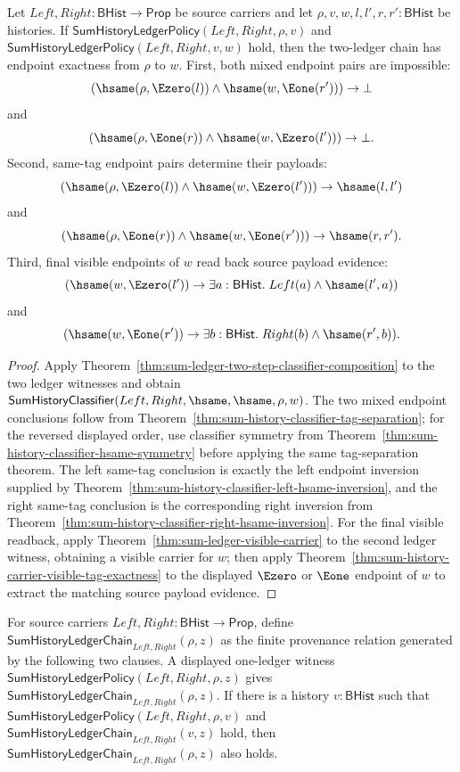 \begin{theorem}
\label{thm:sum-ledger-two-step-endpoint-exactness}
Let $Left,Right:\mathsf{BHist}\to\mathsf{Prop}$ be source carriers and let
$\rho,v,w,l,l',r,r':\mathsf{BHist}$ be histories. If
$\mathsf{SumHistoryLedgerPolicy}(Left,Right,\rho,v)$ and
$\mathsf{SumHistoryLedgerPolicy}(Left,Right,v,w)$ hold, then the two-ledger
chain has endpoint exactness from $\rho$ to $w$. First, both mixed endpoint
pairs are impossible:
$$
(\hsame(\rho,\Ezero(l))\land \hsame(w,\Eone(r')))\to\bot
$$
and
$$
(\hsame(\rho,\Eone(r))\land \hsame(w,\Ezero(l')))\to\bot.
$$
Second, same-tag endpoint pairs determine their payloads:
$$
(\hsame(\rho,\Ezero(l))\land\hsame(w,\Ezero(l')))\to\hsame(l,l')
$$
and
$$
(\hsame(\rho,\Eone(r))\land\hsame(w,\Eone(r')))\to\hsame(r,r').
$$
Third, final visible endpoints of $w$ read back source payload evidence:
$$
(\hsame(w,\Ezero(l'))\to\exists a:\mathsf{BHist}.\;Left(a)\land\hsame(l',a))
$$
and
$$
(\hsame(w,\Eone(r'))\to\exists b:\mathsf{BHist}.\;Right(b)\land\hsame(r',b)).
$$
\end{theorem}
\begin{proof}
Apply Theorem~\ref{thm:sum-ledger-two-step-classifier-composition} to the two
ledger witnesses and obtain
$\mathsf{SumHistoryClassifier}(Left,Right,\hsame,\hsame,\rho,w)$. The two mixed
endpoint conclusions follow from
Theorem~\ref{thm:sum-history-classifier-tag-separation}; for the reversed
displayed order, use classifier symmetry from
Theorem~\ref{thm:sum-history-classifier-hsame-symmetry} before applying the same
tag-separation theorem. The left same-tag conclusion is exactly the left
endpoint inversion supplied by
Theorem~\ref{thm:sum-history-classifier-left-hsame-inversion}, and the right
same-tag conclusion is the corresponding right inversion from
Theorem~\ref{thm:sum-history-classifier-right-hsame-inversion}. For the final
visible readback, apply Theorem~\ref{thm:sum-ledger-visible-carrier} to the
second ledger witness, obtaining a visible carrier for $w$; then apply
Theorem~\ref{thm:sum-history-carrier-visible-tag-exactness} to the displayed
$\Ezero$ or $\Eone$ endpoint of $w$ to extract the matching source payload
evidence.
\end{proof}

\begin{definition}
\label{def:sum-history-ledger-chain}
For source carriers $Left,Right:\mathsf{BHist}\to\mathsf{Prop}$, define
$\mathsf{SumHistoryLedgerChain}_{Left,Right}(\rho,z)$ as the finite provenance
relation generated by the following two clauses. A displayed one-ledger witness
$\mathsf{SumHistoryLedgerPolicy}(Left,Right,\rho,z)$ gives
$\mathsf{SumHistoryLedgerChain}_{Left,Right}(\rho,z)$. If there is a history
$v:\mathsf{BHist}$ such that
$\mathsf{SumHistoryLedgerPolicy}(Left,Right,\rho,v)$ and
$\mathsf{SumHistoryLedgerChain}_{Left,Right}(v,z)$ hold, then
$\mathsf{SumHistoryLedgerChain}_{Left,Right}(\rho,z)$ also holds.
\end{definition}

